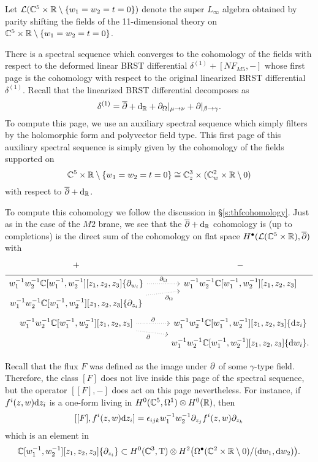 Let $\mathcal L (\mathbb C^5 \times \mathbb R \setminus \{w_1=w_2=t=0\})$ denote the super $L_\infty$ algebra obtained by parity shifting the fields of the 11-dimensional theory on $\mathbb C^5 \times \mathbb R \setminus \{w_1=w_2=t=0\}$. 

There is a spectral sequence which converges to the cohomology of the fields with respect to the deformed linear BRST differential $\delta^{(1)} + [N F_{M5},-]$ whose first page
is the cohomology with respect to the original linearized BRST differential $\delta^{(1)}$. 
Recall that the linearized BRST differential decomposes as
\[
\delta^{(1)} = \overline{\partial} + {\rm d}_{\mathbb R} + \partial_{\Omega} |_{\mu \to \nu} + \partial |_{\beta \to \gamma}  .
\]
To compute this page, we use an auxiliary spectral sequence which simply filters by the holomorphic form and polyvector field type. 
This first page of this auxiliary spectral sequence is simply given by the cohomology of the fields supported on 
\[
\mathbb C^5 \times \mathbb R \setminus \{w_1=w_2=t=0\} \cong \mathbb C_z^3 \times (\mathbb C^2_w \times \mathbb R \setminus 0)
\]
with respect to $\overline{\partial} + {\rm d}_{\mathbb R}$. 

To compute this cohomology we follow the discussion in \S \ref{s:thfcohomology}.
Just as in the case of the $M2$ brane, we see that the $\overline{\partial} + {\rm d}_{\mathbb R}$ cohomology is (up to completions) is the direct sum of the cohomology on flat space $H^\bullet(\mathcal L(\mathbb C^5 \times \mathbb R), \overline{\partial})$ with
\begin{equation}
  \label{eqn:ads7ss2} 
  \begin{tikzcd}[row sep = 1 ex]
    + & - \\ \hline
w_1^{-1} w_2^{-1} \CC[w_1^{-1}, w_2^{-1}][z_1,z_2,z_3] \{\partial_{w_i}\}  \ar[r, dotted, "\div"] & w_1^{-1} w_2^{-1} \CC[w_1^{-1}, w_2^{-1}] [z_1,z_2,z_3] \\
w_1^{-1} w_2^{-1} \CC[w_1^{-1}, w_2^{-1}] [z_1,z_2,z_3] \{\del_{z_i}\} \ar[ur, dotted, "\div"'] \\
w_1^{-1} w_2^{-1} \CC[w_1^{-1}, w_2^{-1}] [z_1,z_2,z_3] \ar[r, dotted, "\del"] \ar[dr, dotted, "\del"'] & w_1^{-1} w_2^{-1} \CC[w_1^{-1}, w_2^{-1}][z_1,z_2,z_3] \{\d z_i\} \\ & w_1^{-1} w_2^{-1} \CC[w_1^{-1}, w_2^{-1}][z_1,z_2,z_3] \{\d w_i\} .
\end{tikzcd}
\end{equation}

Recall that the flux $F$ was defined as the image under $\partial$ of some $\gamma$-type field. 
Therefore, the class $[F]$ does not live inside this page of the spectral sequence, but the operator $[[F], -]$ does act on this page nevertheless. 
For instance, if $f^i(z,w) {\rm d} z_i$ is a one-form living in $H^0(\mathbb C^5, \Omega^1) \otimes H^0(\mathbb R)$, then
\[
[ [F] , f^i (z,w) {\rm d} z_i ] = \epsilon_{ijk} w_1^{-1} w_2^{-1} \partial_{z_j} f^i(z,w) \partial_{z_k} 
\]
which is an element in 
\[
\mathbb C[w_1^{-1}, w_2^{-1}][z_1,z_2,z_3] \{\partial_{z_i}\} \subset H^0(\mathbb C^3, {\rm T}) \otimes H^2 \big(\Omega^\bullet(\mathbb C^2 \times \mathbb R \setminus 0) / ({\rm d} w_1 , {\rm d} w_2) \big) .
\]


